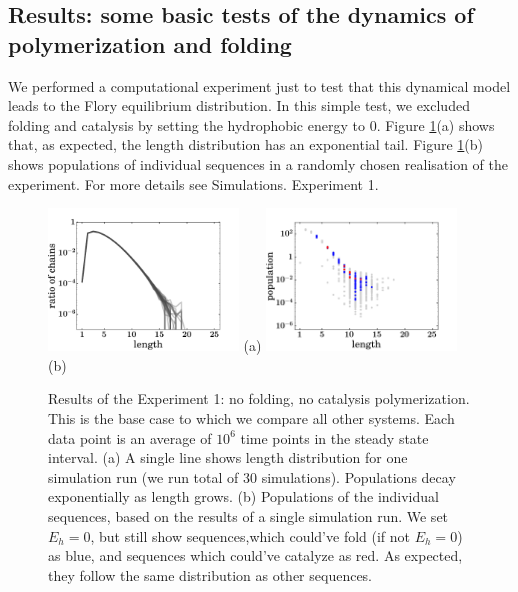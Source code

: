 \documentclass[journal=jacsat,manuscript=article,layout=twocolumn]{achemso}
\begin{document}
\subsection{Results: some basic tests of the dynamics of polymerization and folding}

 We performed a computational experiment just to test that this dynamical model leads to the 
 Flory equilibrium distribution.  In this simple test, we excluded folding and catalysis by setting 
the hydrophobic energy to $0$. Figure \ref{fig:sim_pure_flory}(a) shows that, as expected, the 
length 
distribution has an exponential tail. Figure \ref{fig:sim_pure_flory}(b) shows populations of 
individual sequences in a randomly chosen realisation of the experiment. For more details see 
Simulations. Experiment 1.

\begin{figure}[hbt!]
  \centering
  \includegraphics[width=0.45\textwidth]{pictures/distrPlain-many.pdf} (a)
  \includegraphics[width=0.45\textwidth]{pictures/scatter01918.png} (b)
  \caption{\footnotesize{Results of the Experiment 1: no folding, no catalysis polymerization. This 
is the base case to which we compare all other systems. Each data point is an average of 
$10^6$ time points in the steady state interval. (a) 
A single line shows length distribution for one simulation run (we run total of 30 simulations). 
Populations decay exponentially as length grows. (b) Populations of the individual sequences, based 
on the results of a single simulation run. 
We set $E_h=0$, but still show sequences,which could've fold (if not $E_h=0$) as 
blue, and sequences which could've catalyze as red. As expected, they follow the same distribution 
as other sequences.}}
  \label{fig:sim_pure_flory}
\end{figure}
\end{document}
